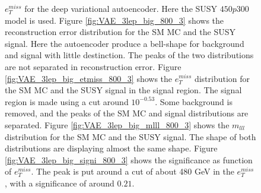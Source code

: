\begin{figure}[H]
{    $e_T^{miss}$ for the deep variational autoencoder. Here the SUSY $450p300$ model is used. 
    Figure \ref{fig:VAE_3lep_big_800_3} shows the reconstruction error 
    distribution for the SM MC and the SUSY signal. Here the autoencoder produce a bell-shape for background and 
    signal with little destinction. The peaks of the two distributions are not separated in reconstruction error. Figure \ref{fig:VAE_3lep_big_etmiss_800_3} 
    shows the $e_T^{miss}$ distribution for the SM MC and the SUSY signal in the signal region. 
    The signal region is made using a cut around $10^{-0.53}$. Some background is removed, and the peaks of the SM MC and signal 
    distributions are separated. Figure \ref{fig:VAE_3lep_big_mlll_800_3} shows the $m_{lll}$ distribution for the SM MC and the SUSY signal. 
    The shape of both distributions are displaying almost the same shape. Figure \ref{fig:VAE_3lep_big_signi_800_3} shows the significance as 
    function of $e_T^{miss}$. The peak is put around a cut of about 480 GeV in the $e_T^{miss}$, with a significance of around $0.21$.}
    \label{fig:VAE_3lep_big_rec_sig_signi_800_3}
\end{figure}

